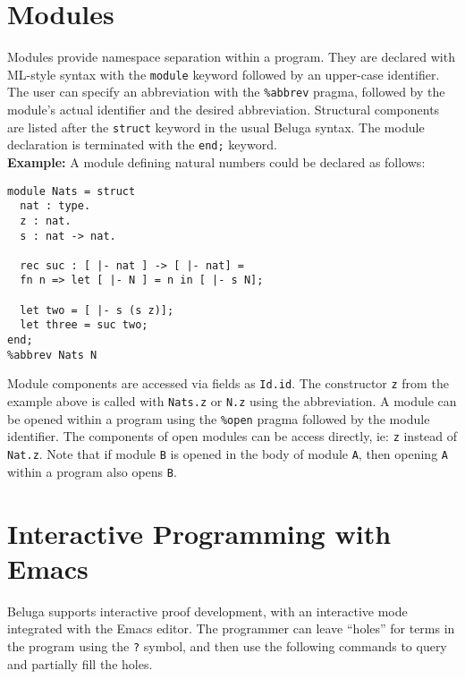 \documentclass[11pt]{article}
\begin{document}


\section{Modules}
Modules provide namespace separation within a program. They are declared with ML-style syntax with the \texttt{module} keyword followed by an upper-case identifier. The user can specify an abbreviation with the \texttt{\%abbrev} pragma, followed by the module's actual identifier and the desired abbreviation. Structural components are listed after the \texttt{struct} keyword in the usual Beluga syntax. The module declaration is terminated with the \texttt{end;} keyword. \\

\textbf{Example:} A module defining natural numbers could be declared as follows:
\begin{verbatim} 
module Nats = struct  
  nat : type.
  z : nat.
  s : nat -> nat.

  rec suc : [ |- nat ] -> [ |- nat] =
  fn n => let [ |- N ] = n in [ |- s N];

  let two = [ |- s (s z)];
  let three = suc two;
end;
%abbrev Nats N
\end{verbatim}

Module components are accessed via fields as \texttt{Id.id}. The constructor \texttt{z} from the example above is called with \texttt{Nats.z} or \texttt{N.z} using the abbreviation. A module can be opened within a program using the \texttt{\%open} pragma followed by the module identifier. The components of open modules can be access directly, ie: \texttt{z} instead of \texttt{Nat.z}. Note that if module \texttt{B} is opened in the body of module \texttt{A}, then opening \texttt{A} within a program also opens \texttt{B}.


\section{Interactive Programming with Emacs}
Beluga supports interactive proof development, with an interactive mode integrated with the Emacs editor. The programmer can leave ``holes'' for terms in the program using the \texttt{?} symbol, and then use the following commands to query and partially fill the holes.
\end{document}

